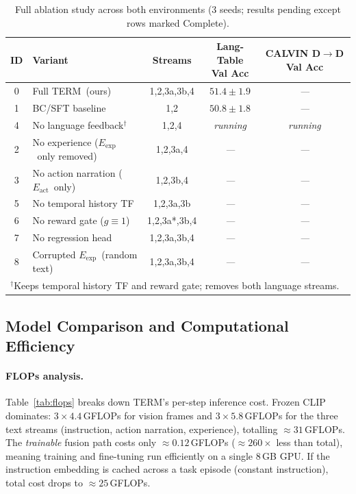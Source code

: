 \documentclass{article}
\newcommand{\modelname}{\textsc{TERM}\xspace}
\newcommand{\Lact}{$E_{\mathrm{act}}$\xspace}
\newcommand{\Lexp}{$E_{\mathrm{exp}}$\xspace}
\newcommand{\tbd}{\textit{---}\xspace}
\begin{document}
\begin{table}[h]
\centering
\caption{Full ablation study across both environments (3 seeds; results pending except rows marked Complete).}
\label{tab:ablations}
\small
\setlength{\tabcolsep}{4pt}
\begin{tabular}{clccc}
\toprule
\textbf{ID} & \textbf{Variant} & \textbf{Streams}
            & \makecell{Lang-Table\\Val Acc}
            & \makecell{CALVIN D$\to$D\\Val Acc} \\
\midrule
0  & Full \modelname\ (ours)              & 1,2,3a,3b,4  & $\mathbf{51.4\pm1.9}$ & \tbd \\
1  & BC/SFT baseline                      & 1,2          & $50.8\pm1.8$          & \tbd \\
4  & No language feedback$^\dagger$       & 1,2,4        & \textit{running}      & \textit{running} \\
2  & No experience (\Lexp\ only removed)  & 1,2,3a,4     & \tbd                  & \tbd \\
3  & No action narration (\Lact\ only)    & 1,2,3b,4     & \tbd                  & \tbd \\
5  & No temporal history TF               & 1,2,3a,3b    & \tbd                  & \tbd \\
6  & No reward gate ($g\!\equiv\!1$)      & 1,2,3a*,3b,4 & \tbd                  & \tbd \\
7  & No regression head                   & 1,2,3a,3b,4  & \tbd                  & \tbd \\
8  & Corrupted \Lexp\ (random text)       & 1,2,3a,3b,4  & \tbd                  & \tbd \\
\bottomrule
\multicolumn{5}{l}{\footnotesize $^\dagger$Keeps temporal history TF and reward gate; removes both language streams.}\\
\end{tabular}
\end{table}

\subsection{Model Comparison and Computational Efficiency}
\label{sec:comparison}

\paragraph{FLOPs analysis.}
Table~\ref{tab:flops} breaks down TERM's per-step inference cost.
Frozen CLIP dominates: $3 \times 4.4$\,GFLOPs for vision frames
and $3 \times 5.8$\,GFLOPs for the three text streams
(instruction, action narration, experience), totalling $\approx\!31$\,GFLOPs.
The \emph{trainable} fusion path costs only $\approx\!0.12$\,GFLOPs
(${\approx}260\times$ less than total), meaning training
and fine-tuning run efficiently on a single 8\,GB GPU.
If the instruction embedding is cached across a task episode (constant instruction),
total cost drops to $\approx\!25$\,GFLOPs.
\end{document}
